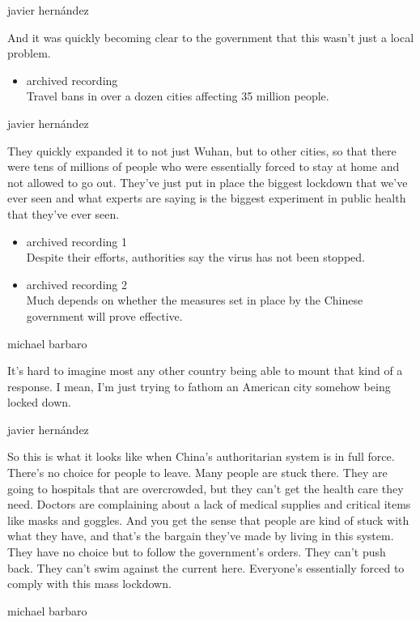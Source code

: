 javier hernández

And it was quickly becoming clear to the government that this wasn't
just a local problem.

\begin{itemize}
\tightlist
\item
  archived recording\\
  Travel bans in over a dozen cities affecting 35 million people.
\end{itemize}

javier hernández

They quickly expanded it to not just Wuhan, but to other cities, so that
there were tens of millions of people who were essentially forced to
stay at home and not allowed to go out. They've just put in place the
biggest lockdown that we've ever seen and what experts are saying is the
biggest experiment in public health that they've ever seen.

\begin{itemize}
\item
  archived recording 1\\
  Despite their efforts, authorities say the virus has not been stopped.
\item
  archived recording 2\\
  Much depends on whether the measures set in place by the Chinese
  government will prove effective.
\end{itemize}

michael barbaro

It's hard to imagine most any other country being able to mount that
kind of a response. I mean, I'm just trying to fathom an American city
somehow being locked down.

javier hernández

So this is what it looks like when China's authoritarian system is in
full force. There's no choice for people to leave. Many people are stuck
there. They are going to hospitals that are overcrowded, but they can't
get the health care they need. Doctors are complaining about a lack of
medical supplies and critical items like masks and goggles. And you get
the sense that people are kind of stuck with what they have, and that's
the bargain they've made by living in this system. They have no choice
but to follow the government's orders. They can't push back. They can't
swim against the current here. Everyone's essentially forced to comply
with this mass lockdown.

michael barbaro

